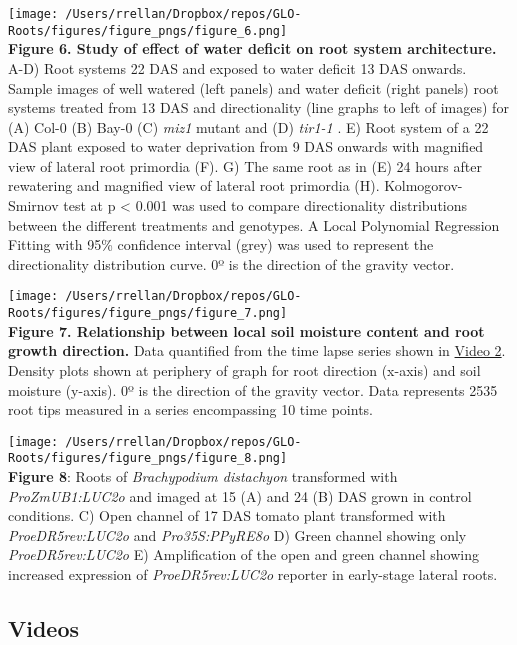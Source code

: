 \documentclass[]{article}
\begin{document}
\pagebreak

\texttt{[image: /Users/rrellan/Dropbox/repos/GLO-Roots/figures/figure\_pngs/figure\_6.png]}\\\textbf{Figure
6. Study of effect of water deficit on root system architecture.} A-D)
Root systems 22 DAS and exposed to water deficit 13 DAS onwards. Sample
images of well watered (left panels) and water deficit (right panels)
root systems treated from 13 DAS and directionality (line graphs to left
of images) for (A) Col-0 (B) Bay-0 (C) \emph{miz1} mutant and (D)
\emph{tir1-1} . E) Root system of a 22 DAS plant exposed to water
deprivation from 9 DAS onwards with magnified view of lateral root
primordia (F). G) The same root as in (E) 24 hours after rewatering and
magnified view of lateral root primordia (H). Kolmogorov-Smirnov test at
p \textless{} 0.001 was used to compare directionality distributions
between the different treatments and genotypes. A Local Polynomial
Regression Fitting with 95\% confidence interval (grey) was used to
represent the directionality distribution curve. 0º is the direction of
the gravity vector.

\pagebreak

\texttt{[image: /Users/rrellan/Dropbox/repos/GLO-Roots/figures/figure\_pngs/figure\_7.png]}\\\textbf{Figure
7. Relationship between local soil moisture content and root growth
direction.} Data quantified from the time lapse series shown in
\href{https://www.dropbox.com/s/x24x1uhvc8x0ou9/Video_3.avi?dl=0}{Video
2}. Density plots shown at periphery of graph for root direction
(x-axis) and soil moisture (y-axis). 0º is the direction of the gravity
vector. Data represents 2535 root tips measured in a series encompassing
10 time points.

\pagebreak

\texttt{[image: /Users/rrellan/Dropbox/repos/GLO-Roots/figures/figure\_pngs/figure\_8.png]}\\\textbf{Figure
8}: Roots of \emph{Brachypodium distachyon} transformed with
\emph{ProZmUB1:LUC2o} and imaged at 15 (A) and 24 (B) DAS grown in
control conditions. C) Open channel of 17 DAS tomato plant transformed
with \emph{ProeDR5rev:LUC2o} and \emph{Pro35S:PPyRE8o} D) Green channel
showing only \emph{ProeDR5rev:LUC2o} E) Amplification of the open and
green channel showing increased expression of \emph{ProeDR5rev:LUC2o}
reporter in early-stage lateral roots.

\pagebreak

\subsection{Videos}\label{videos}
\end{document}
